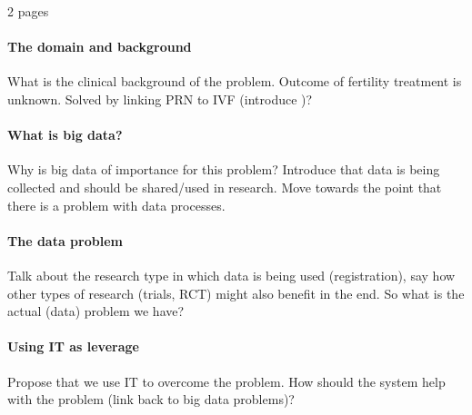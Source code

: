 2 pages

\paragraph{The domain and background}
What is the clinical background of the problem. 
Outcome of fertility treatment is unknown.
Solved by linking PRN to IVF (introduce \project{})?
\paragraph{What is big data?}
Why is big data of importance for this problem?
Introduce that data is being collected and should be shared/used in research.
Move towards the point that there is a problem with data processes.
\paragraph{The data problem}
Talk about the research type in which data is being used (registration), say how other types of research (trials, RCT) might also benefit in the end.
So what is the actual (data) problem we have?
\paragraph{Using IT as leverage}
Propose that we use IT to overcome the problem.
How should the system help with the problem (link back to big data problems)?
